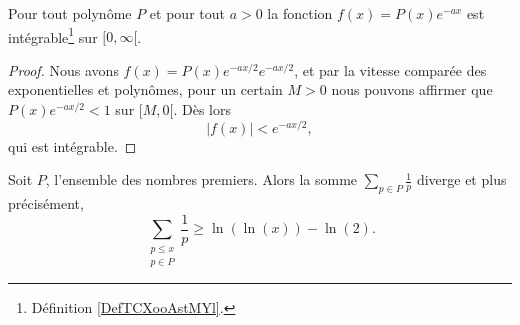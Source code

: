 \begin{proposition} \label{PropBQGBooHxNrrf}
    Pour tout polynôme \( P\) et pour tout \( a>0\) la fonction \( f(x)=P(x) e^{-ax}\) est intégrable\footnote{Définition \ref{DefTCXooAstMYl}.} sur \( \mathopen[ 0 , \infty [\).
\end{proposition}

\begin{proof}
    Nous avons \( f(x)=P(x) e^{-ax/2} e^{-ax/2}\), et par la vitesse comparée des exponentielles et polynômes, pour un certain \( M>0\) nous pouvons affirmer que \( P(x) e^{-ax/2}<1\) sur \( \mathopen[ M , 0 [\). Dès lors
        \begin{equation}
            | f(x) |< e^{-ax/2},
        \end{equation}
        qui est intégrable.
\end{proof}

\begin{theorem} \label{ThonfVruT}
    Soit \( P\), l'ensemble des nombres premiers. Alors la somme \( \sum_{p\in P}\frac{1}{ p }\) diverge et plus précisément,
    \begin{equation}
        \sum_{\substack{p\leq x\\p\in P}}\frac{1}{ p }\geq \ln(\ln(x))-\ln(2).
    \end{equation}
\end{theorem}

